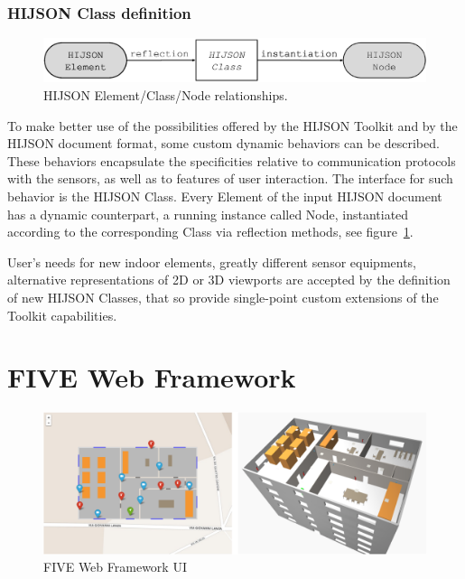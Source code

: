 \documentclass[]{egpubl}
\begin{document}
\subsubsection*{HIJSON Class definition}

\begin{figure}[h]
 \centering
 \includegraphics[width=\linewidth]{images/element-class-node}
 \caption{HIJSON Element/Class/Node relationships.}
 \label{fig:el-class-node}
\end{figure}

To make better use of the possibilities offered by the HIJSON Toolkit and by
the HIJSON document format, some custom dynamic behaviors can be described.
These behaviors encapsulate the specificities relative to communication
protocols with the sensors, as well as to features of user interaction. The
interface for such behavior is the HIJSON Class. Every Element of the input
HIJSON document has a dynamic counterpart, a running instance called  Node,
instantiated according to the corresponding Class via reflection methods, see figure~\ref{fig:el-class-node}.


User's needs for new indoor elements, greatly different sensor equipments,
alternative representations of 2D or 3D viewports are accepted by the
definition of new HIJSON Classes, that so provide single-point custom
extensions of the Toolkit capabilities.

\section{FIVE Web Framework}


\begin{figure}[htb]
\centering
\includegraphics[width=\linewidth]{images/2D-3D}
\caption{FIVE Web Framework UI}
\label{fig:web-framework-ui}
\end{figure}
\end{document}
